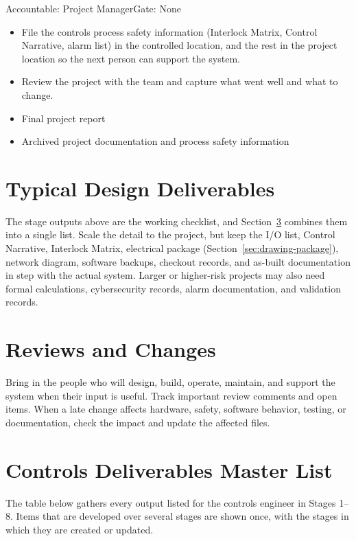 \begin{stagecard}{Accountable: Project Manager}{Gate: None}
\begin{itemize}[leftmargin=*,itemsep=1pt,topsep=2pt]
  \item File the controls process safety information (Interlock Matrix, Control Narrative, alarm list) in the controlled location, and the rest in the project location so the next person can support the system.
  \item Review the project with the team and capture what went well and what to change.
\end{itemize}
\tcbline
{}\par
\begin{itemize}[leftmargin=*,itemsep=1pt,topsep=2pt]
  \item Final project report
  \item Archived project documentation and process safety information
\end{itemize}
\tcbline
{}
\end{stagecard}

\section{Typical Design Deliverables}
The stage outputs above are the working checklist, and Section~\ref{sec:deliverables-master} combines them into a single list. Scale the detail to the project, but keep the I/O list, Control Narrative, Interlock Matrix, electrical package (Section~\ref{sec:drawing-package}), network diagram, software backups, checkout records, and as-built documentation in step with the actual system. Larger or higher-risk projects may also need formal calculations, cybersecurity records, alarm documentation, and validation records.

\section{Reviews and Changes}
Bring in the people who will design, build, operate, maintain, and support the system when their input is useful. Track important review comments and open items. When a late change affects hardware, safety, software behavior, testing, or documentation, check the impact and update the affected files.

\section{Controls Deliverables Master List}\label{sec:deliverables-master}
The table below gathers every output listed for the controls engineer in Stages 1--8. Items that are developed over several stages are shown once, with the stages in which they are created or updated.

